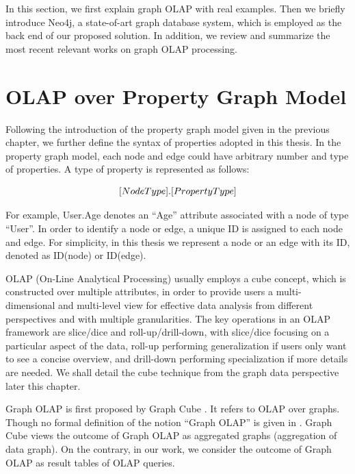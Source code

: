 In this section, we first explain graph OLAP with real examples. Then we briefly introduce Neo4j, a state-of-art graph database system, which is employed as the back end of our proposed solution. In addition, we review and summarize the most recent relevant works on graph OLAP processing.


\section{OLAP over Property Graph Model}


Following the introduction of the property graph model given in the previous chapter, we further define the syntax of properties adopted in this thesis. In the property graph model, each node and edge could have arbitrary number and type of properties. A type of property is represented as follows:

\begin{displaymath}
\centering
[NodeType].[PropertyType]
\end{displaymath}

For example, User.Age denotes an ``Age'' attribute associated with a node of type ``User''. In order to identify a node or edge, a unique ID is assigned to each node and edge.  For simplicity, in this thesis we represent a node or an edge with its ID, denoted as ID(node) or ID(edge).


OLAP (On-Line Analytical Processing) \cite{DBLP:conf/sigmod/BeyerR99, DBLP:journals/datamine/GrayCBLRVPP97, DBLP:conf/sigmod/ZhaoDN97} usually employs a cube concept, which is constructed over multiple attributes, in order to provide users a multi-dimensional and multi-level view for effective data analysis from different perspectives and with multiple granularities. The key operations in an OLAP framework are slice/dice and roll-up/drill-down, with slice/dice focusing on a particular aspect of the data, roll-up performing generalization if users only want to see a concise overview, and drill-down performing specialization if more details are needed. We shall detail the cube technique from the graph data perspective later this chapter.

 Graph OLAP is first proposed by Graph Cube \cite{DBLP:conf/sigmod/ZhaoLXH11}. It refers to OLAP over graphs. Though no formal definition of the notion ``Graph OLAP'' is given in \cite{DBLP:conf/sigmod/ZhaoLXH11}. Graph Cube \cite{DBLP:conf/sigmod/ZhaoLXH11} views the outcome of Graph OLAP as aggregated graphs (aggregation of data graph). On the contrary, in our work, we consider the outcome of Graph OLAP as result tables of OLAP queries.

